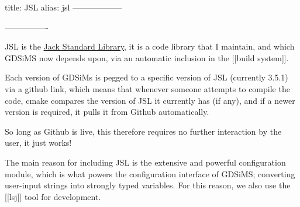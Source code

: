 title: JSL
alias: jsl
------------------
\usepackage{hyperref}
\hypersetup{
	colorlinks=true,
	linkcolor=blue,
	filecolor=magenta,
	urlcolor=blue,
}
----------------

JSL is the \href{https://github.com/DrFraserGovil/JSL}{Jack Standard Library}, it is a code library that I maintain, and which GDSiMS now depends upon, via an automatic inclusion in the [[build system]].

Each version of GDSiMs is pegged to a specific version of JSL (currently 3.5.1) via a github link, which means that whenever someone attempts to compile the code, cmake compares the version of JSL it currently has (if any), and if a newer version is required, it pulls it from Github automatically.

So long as Github is live, this therefore requires no further interaction by the user, it just works!

The main reason for including JSL is the extensive and powerful configuration module, which is what powers the configuration interface of GDSiMS; converting user-input strings into strongly typed variables. For this reason, we also use the [[lsj]] tool for development.
